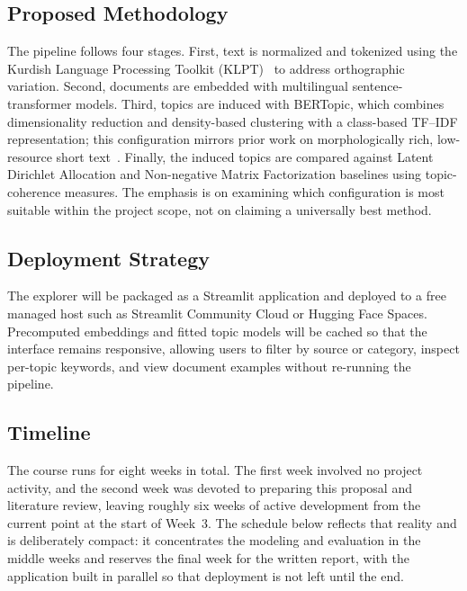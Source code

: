 \documentclass[12pt,a4paper]{article}
\begin{document}
\subsection{Proposed Methodology}
The pipeline follows four stages. First, text is normalized and tokenized using the Kurdish Language Processing Toolkit (KLPT)~\cite{ahmadiKLPTKurdishLanguage2020} to address orthographic variation. Second, documents are embedded with multilingual sentence-transformer models. Third, topics are induced with BERTopic, which combines dimensionality reduction and density-based clustering with a class-based TF--IDF representation; this configuration mirrors prior work on morphologically rich, low-resource short text~\cite{medveckiMultilingualTransformerBERTopic2024}. Finally, the induced topics are compared against Latent Dirichlet Allocation and Non-negative Matrix Factorization baselines using topic-coherence measures. The emphasis is on examining which configuration is most suitable within the project scope, not on claiming a universally best method.

\subsection{Deployment Strategy}
The explorer will be packaged as a Streamlit application and deployed to a free managed host such as Streamlit Community Cloud or Hugging Face Spaces. Precomputed embeddings and fitted topic models will be cached so that the interface remains responsive, allowing users to filter by source or category, inspect per-topic keywords, and view document examples without re-running the pipeline.

\subsection{Timeline}
The course runs for eight weeks in total. The first week involved no project activity, and the second week was devoted to preparing this proposal and literature review, leaving roughly six weeks of active development from the current point at the start of Week~3. The schedule below reflects that reality and is deliberately compact: it concentrates the modeling and evaluation in the middle weeks and reserves the final week for the written report, with the application built in parallel so that deployment is not left until the end.
\end{document}
